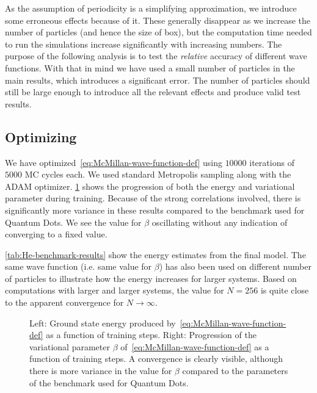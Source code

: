 \documentclass[Thesis.tex]{subfiles}
\begin{document}
\noindent As the assumption of periodicity is a simplifying approximation, we
introduce some erroneous effects because of it. These generally disappear as we
increase the number of particles (and hence the size of box), but the
computation time needed to run the simulations increase significantly with
increasing numbers. The purpose of the following analysis is to test the
\emph{relative} accuracy of different wave functions. With that in mind we have
used a small number of particles in the main results, which introduces a
significant error. The number of particles should still be large enough to
introduce all the relevant effects and produce valid test results.


\subsection{Optimizing}

We have optimized~\cref{eq:McMillan-wave-function-def} using $\num{10000}$
iterations of $\num{5000}$ MC cycles each. We used standard Metropolis sampling
along with the ADAM optimizer. \cref{fig:He-benchmark-training} shows the
progression of both the energy and variational parameter during training.
Because of the strong correlations involved, there is significantly more
variance in these results compared to the benchmark used for Quantum Dots. We
see the value for $\beta$ oscillating without any indication of converging to a
fixed value.

\cref{tab:He-benchmark-results} show the energy estimates from the final model.
The same wave function (i.e. same value for $\beta$) has also been used on
different number of particles to illustrate how the energy increases for larger
systems. Based on computations with larger and larger systems, the value for $N
= 256$ is quite close to the apparent convergence for $N\to\infty$.

\begin{figure}[h]
  \centering
  \resizebox{\linewidth}{!}{%
    
  }
  \caption[Learning progression of McMillan wave function on $^4$He]{\label{fig:He-benchmark-training}Left: Ground state energy produced by~\cref{eq:McMillan-wave-function-def}
    as a function of training steps. Right: Progression of the variational
    parameter $\beta$ of~\cref{eq:McMillan-wave-function-def} as a function of
    training steps. A convergence is clearly visible, although there is more
    variance in the value for $\beta$ compared to the parameters of the
    benchmark used for Quantum Dots.}
\end{figure}
\end{document}
